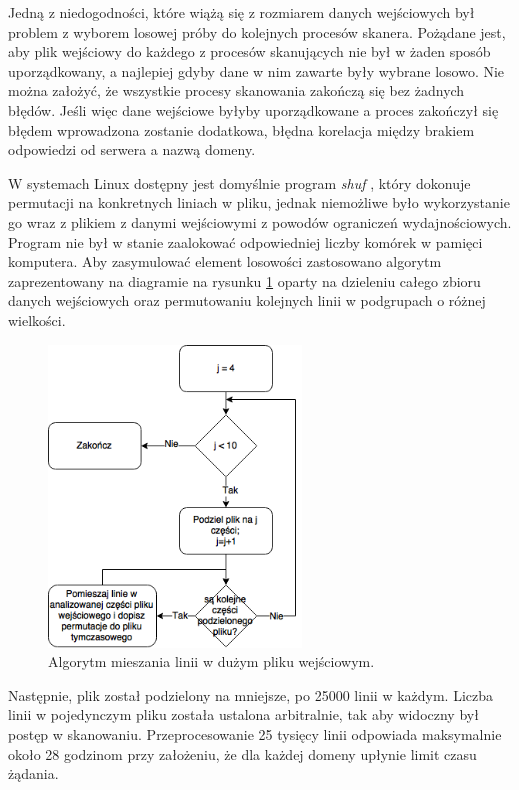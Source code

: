 Jedną z niedogodności, które wiążą się z rozmiarem danych wejściowych był problem z wyborem losowej próby do kolejnych procesów
skanera. Pożądane jest, aby plik wejściowy do każdego z procesów skanujących nie był w żaden sposób uporządkowany, a najlepiej
gdyby dane w nim zawarte były wybrane losowo. Nie można założyć, że wszystkie procesy skanowania zakończą się bez żadnych błędów.
Jeśli więc dane wejściowe byłyby uporządkowane a proces zakończył się błędem wprowadzona zostanie dodatkowa, błędna korelacja między
brakiem odpowiedzi od serwera a nazwą domeny.

W systemach Linux dostępny jest domyślnie program \textit{shuf} \cite{shuf}, który dokonuje permutacji na konkretnych liniach w pliku,
jednak niemożliwe było wykorzystanie go wraz z plikiem z danymi wejściowymi z powodów ograniczeń wydajnościowych. Program nie był w
stanie zaalokować odpowiedniej liczby komórek w pamięci komputera. Aby zasymulować element losowości zastosowano algorytm zaprezentowany
na diagramie na rysunku \ref{fig:shufAlgorithm} oparty na dzieleniu całego zbioru danych wejściowych oraz permutowaniu kolejnych linii
w podgrupach o różnej wielkości.

\begin{figure}[h]
	\centering
	\includegraphics[width=0.6\textwidth]{image/sfuh}
	\caption{Algorytm mieszania linii w dużym pliku wejściowym.}
	\label{fig:shufAlgorithm}
\end{figure}

Następnie, plik został podzielony na mniejsze, po 25000 linii w każdym. Liczba linii w pojedynczym pliku została ustalona arbitralnie,
tak aby widoczny był postęp w skanowaniu. Przeprocesowanie 25 tysięcy linii odpowiada maksymalnie około 28 godzinom przy założeniu,
że dla każdej domeny upłynie limit czasu żądania.

